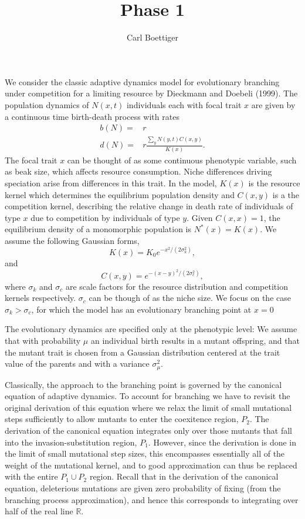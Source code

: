 \documentclass[letterpaper,10pt]{article}
\title{Phase 1}
\author{Carl Boettiger}
\begin{document}
\maketitle
We consider the classic adaptive dynamics model for evolutionary branching under competition for a limiting resource by Dieckmann and Doebeli (1999).  The population dynamics of $N(x,t)$ individuals each with focal trait $x$ are given by a continuous time birth-death process with rates 
\begin{align}
b(N) = & r \nonumber \\
d(N) = & r \frac{\sum_yN(y,t)C(x,y)}{K(x)} .\label{general_logistic}
\end{align}
The focal trait $x$ can be thought of as some continuous phenotypic variable, such as beak size, which affects resource consumption.  Niche differences driving speciation arise from differences in this trait.  In the model, $K(x)$ is the resource kernel which determines the equilibrium population density and $C(x,y)$ is a the competition kernel, describing the relative change in death rate of individuals of type $x$ due to competition by individuals of type $y$.  Given $C(x,x)=1$, the equilibrium density of a monomorphic population is $N^{\ast}(x)=K(x)$.  We assume the following Gaussian forms,
\begin{equation}
K(x)=K_0e^{-x^2/(2\sigma_k^2)}, \label{K}
\end{equation}
and
\begin{equation}
C(x,y)=e^{-(x-y)^2/(2\sigma_c^2)}, \label{C}
\end{equation}
where $\sigma_k$ and $\sigma_c$ are scale factors for the resource distribution and competition kernels respectively.  $\sigma_c$ can be though of as the niche size.  We focus on the case $\sigma_k>\sigma_c$, for which the model has an evolutionary branching point at $x=0$

The evolutionary dynamics are specified only at the phenotypic level: We assume that with probability $\mu$ an individual birth results in a mutant offspring, and that the mutant trait is chosen from a Gaussian distribution centered at the trait value of the parents and with a variance $\sigma_{\mu}^2$. 



Classically, the approach to the branching point is governed by the canonical equation of adaptive dynamics.  To account for branching we have to revisit the original derivation of this equation where we relax the limit of small mutational steps sufficiently to allow mutants to enter the coexitence region, $P_2$.  The derivation of the canonical equation integrates only over those mutants that fall into the invasion-substitution region, $P_1$.  However, since the derivation is done in the limit of small mutational step sizes, this encompasses essentially all of the weight of the mutational kernel, and to good approximation can thus be replaced with the entire $P_1 \cup P_2$ region.  Recall that in the derivation of the canonical equation, deleterious mutations are given zero probability of fixing (from the branching process approximation), and hence this corresponds to integrating over half of the real line $\mathbb{R}$.  
\end{document}
